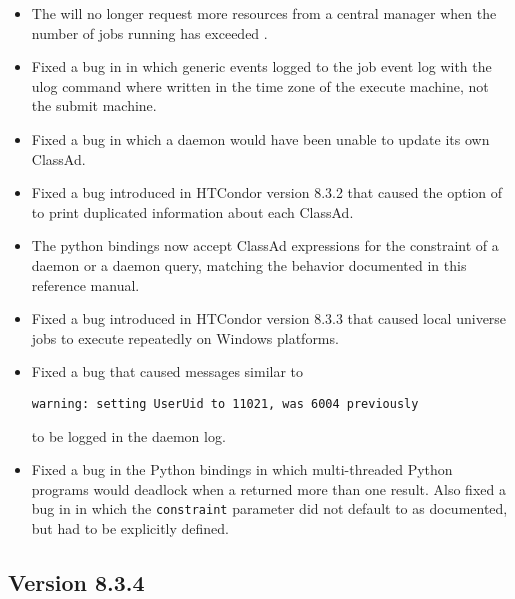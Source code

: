 \begin{itemize}

\item The  will no longer request more resources from
a central manager when the number of jobs running has exceeded
.

\item Fixed a bug in  in which generic events logged
to the job event log with the ulog command where written in the time zone
of the execute machine, not the submit machine.

\item Fixed a bug in which a  daemon would have been unable 
to update its own ClassAd.

\item Fixed a bug introduced in HTCondor version 8.3.2 that caused the 
 option of  to print duplicated information 
about each ClassAd.

\item The python bindings now accept ClassAd expressions for the constraint
of a  daemon or a  daemon query, 
matching the behavior documented in this reference manual.

\item Fixed a bug introduced in HTCondor version 8.3.3 that caused 
local universe jobs to execute repeatedly on Windows platforms.

\item Fixed a bug that caused messages similar to
\begin{verbatim}
warning: setting UserUid to 11021, was 6004 previously
\end{verbatim}
to be logged in the  daemon log. 

\item Fixed a bug in the Python bindings in which multi-threaded Python
programs would deadlock when a  returned more than
one result.
Also fixed a bug in  in which
the \texttt{constraint} parameter did not default to  as documented,
but had to be explicitly defined.

\end{itemize}

\subsection*{\label{sec:New-8-3-4}Version 8.3.4}

